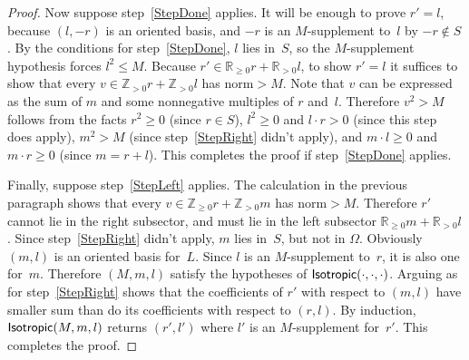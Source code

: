\documentclass[12pt]{amsart}
\def\R{\mathbb{R}}
\def\Z{\mathbb{Z}}
\numberwithin{theorem}{section}
\numberwithin{equation}{section}
\numberwithin{figure}{section}
\theoremstyle{remark}
\begin{document}
\begin{proof}
    Now suppose step~\ref{StepDone} applies.
    It will be enough to prove $r'=l$, because $(l,-r)$ is an oriented basis,
    and $-r$ is an $M$-supplement to~$l$ by $-r\notin S$.  
    By the conditions for step~\ref{StepDone}, $l$ lies in~$S$, so the
    $M$-supplement hypothesis forces $l^2\leq M$.  
    Because $r'\in \R_{\geq0}r+\R_{>0}l$,  to show $r'=l$ it suffices to
    show that every $v\in\Z_{>0}r+\Z_{>0}l$ has norm${}>M$.
    Note that $v$ can be expressed as the sum of $m$ and some nonnegative
    multiples of $r$ and~$l$.   Therefore $v^2>M$ follows from the facts
    $r^2\geq 0$ (since $r\in S$),
    $l^2\geq0$ and $l\cdot r>0$ (since this step does apply), 
    $m^2>M$ (since step~\ref{StepRight} didn't apply), and $m\cdot l\geq0$ and $m\cdot r\geq0$
    (since $m=r+l$).
    This completes the proof if step~\ref{StepDone} applies.

    Finally, suppose step~\ref{StepLeft} applies.  The calculation in the
    previous paragraph shows that every $v\in\Z_{\geq0}r+\Z_{>0}m$
    has norm${}>M$.  Therefore $r'$ cannot lie in the right subsector,
    and must lie in the left subsector $\R_{\geq0}m+\R_{>0}l$.
    Since step~\ref{StepRight} didn't apply, $m$ lies in~$S$, but not in $\Omega$.  
    Obviously
    $(m,l)$ is an oriented basis for~$L$.  Since $l$ is an $M$-supplement
    to~$r$, it is also one for~$m$.  Therefore $(M,m,l)$ satisfy the
    hypotheses of ${\sf Isotropic(\cdot,\cdot,\cdot)}$.  
    Arguing as for step~\ref{StepRight} shows that the coefficients
    of $r'$ with respect to $(m,l)$ have smaller sum than do its 
    coefficients with respect to $(r,l)$.  By induction,
    ${\sf Isotropic}(M,m,l)$ returns $(r',l')$ where $l'$
    is an $M$-supplement for~$r'$.  This completes the proof.
\end{proof}
\end{document}
